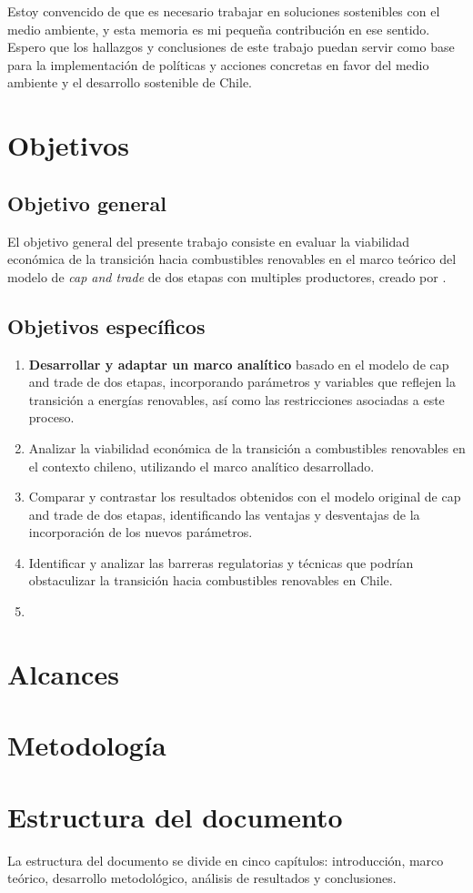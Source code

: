Estoy convencido de que es necesario trabajar en soluciones sostenibles con el medio ambiente, y esta memoria es mi pequeña contribución en ese sentido. Espero que los hallazgos y conclusiones de este trabajo puedan servir como base para la implementación de políticas y acciones concretas en favor del medio ambiente y el desarrollo sostenible de Chile.
\vspace{2.5mm}


\section{Objetivos}
\subsection{Objetivo general}
El objetivo general del presente trabajo consiste en evaluar la viabilidad económica de la transición hacia combustibles renovables en el marco teórico del modelo de \textit{cap and trade} de dos etapas con multiples productores, creado por .
\vspace{2.5mm}

\subsection{Objetivos específicos}

\begin{enumerate}
\item \textbf{Desarrollar y adaptar un marco analítico} basado en el modelo de cap and trade de dos etapas, incorporando parámetros y variables que reflejen la transición a energías renovables, así como las restricciones asociadas a este proceso.
    
\item Analizar la viabilidad económica de la transición a combustibles renovables en el contexto chileno, utilizando el marco analítico desarrollado.
    
\item Comparar y contrastar los resultados obtenidos con el modelo original de cap and trade de dos etapas, identificando las ventajas y desventajas de la incorporación de los nuevos parámetros.

\item  Identificar y analizar las barreras regulatorias y técnicas que podrían obstaculizar la transición hacia combustibles renovables en Chile.
\item 
\end{enumerate}


\section{Alcances}




\section{Metodología}



\newpage
\section{Estructura del documento}

La estructura del documento se divide en cinco capítulos: introducción, marco teórico, desarrollo metodológico, análisis de resultados y conclusiones.


